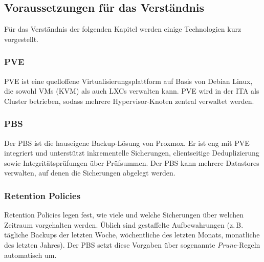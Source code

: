 \subsection{Voraussetzungen für das Verständnis}
\label{sec:Voraussetzungen}
Für das Verständnis der folgenden Kapitel werden einige Technologien kurz
vorgestellt.

\subsubsection{\acl{PVE}}
\acl{PVE} ist eine quelloffene Virtualisierungsplattform auf Basis von
Debian Linux, die sowohl \acp{VM} (KVM) als auch \acp{LXC} verwalten kann.
\ac{PVE} wird in der \ac{ITA} als Cluster betrieben, sodass mehrere
Hypervisor-Knoten zentral verwaltet werden.

\subsubsection{\acl{PBS}}
Der \ac{PBS} ist die hauseigene Backup-Lösung von Proxmox.
Er ist eng mit \ac{PVE} integriert und unterstützt inkrementelle
Sicherungen, clientseitige Deduplizierung sowie Integritätsprüfungen
über Prüfsummen.
Der \ac{PBS} kann mehrere Datastores verwalten, auf denen die Sicherungen
abgelegt werden.

\subsubsection{Retention Policies}
Retention Policies legen fest, wie viele und welche Sicherungen über
welchen Zeitraum vorgehalten werden. Üblich sind gestaffelte
Aufbewahrungen (z.\,B. tägliche Backups der letzten Woche, wöchentliche
des letzten Monats, monatliche des letzten Jahres). Der \ac{PBS} setzt
diese Vorgaben über sogenannte \emph{Prune}-Regeln automatisch um.
